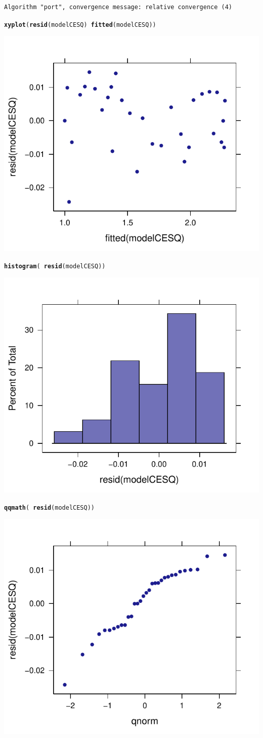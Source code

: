\documentclass[preprint,authoryear,12pt]{elsarticle}\usepackage{graphicx, color}
\makeatletter
\newcommand{\hlfunctioncall}[1]{\textcolor[rgb]{0.501960784313725,0,0.329411764705882}{\textbf{#1}}}%
\newenvironment{kframe}{%
 \def\at@end@of@kframe{}%
 \ifinner\ifhmode%
  \def\at@end@of@kframe{\end{minipage}}%
  \begin{minipage}{\columnwidth}%
 \fi\fi%
 \def\FrameCommand##1{\hskip\@totalleftmargin \hskip-\fboxsep
 \colorbox{shadecolor}{##1}\hskip-\fboxsep
     \hskip-\linewidth \hskip-\@totalleftmargin \hskip\columnwidth}%
 \MakeFramed {\advance\hsize-\width
   \@totalleftmargin\z@ \linewidth\hsize
   \@setminipage}}%
 {\par\unskip\endMakeFramed%
 \at@end@of@kframe}
\newenvironment{knitrout}{}{} %
\makeatother
\begin{document}
\begin{knitrout}
\begin{kframe}
\begin{verbatim}
Algorithm "port", convergence message: relative convergence (4) 
\end{verbatim}
\begin{alltt}
\hlfunctioncall{xyplot}( \hlfunctioncall{resid}(modelCESQ) ~ \hlfunctioncall{fitted}(modelCESQ) )
\end{alltt}
\end{kframe}
\includegraphics[width=.45\textwidth,height=.38\textwidth]{figure/unnamed-chunk-61} 
\begin{kframe}\begin{alltt}
\hlfunctioncall{histogram}( ~\hlfunctioncall{resid}(modelCESQ) )
\end{alltt}
\end{kframe}
\includegraphics[width=.45\textwidth,height=.38\textwidth]{figure/unnamed-chunk-62} 
\begin{kframe}\begin{alltt}
\hlfunctioncall{qqmath}( ~\hlfunctioncall{resid}(modelCESQ) )
\end{alltt}
\end{kframe}
\includegraphics[width=.45\textwidth,height=.38\textwidth]{figure/unnamed-chunk-63} 

\end{knitrout}
\end{document}
